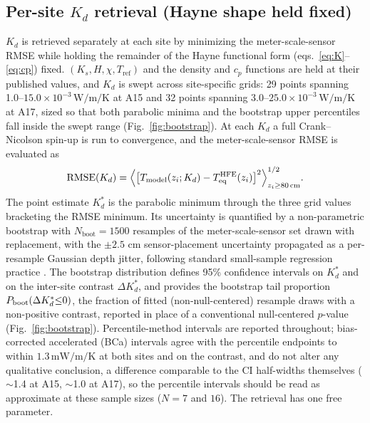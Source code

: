 \documentclass[11pt]{article}
\newcommand{\zborestem}{80\,\si{\centi\meter}}
\begin{document}
\subsection{Per-site $K_d$ retrieval (Hayne shape held fixed)}%
\label{sec:methods-kd}
$K_d$ is retrieved separately at each site by minimizing the
meter-scale-sensor RMSE while holding the remainder
of the Hayne functional form (eqs.~\ref{eq:K}--\ref{eq:cp}) fixed.
$(K_s,H,\chi,T_\mathrm{ref})$ and the density and $c_p$ functions are held
at their published values, and $K_d$ is swept across site-specific grids:
29 points spanning
1.0--$15.0\times10^{-3}\,\si{\watt\per\meter\per\kelvin}$ at A15 and 32
points spanning
3.0--$25.0\times10^{-3}\,\si{\watt\per\meter\per\kelvin}$ at A17, sized so
that both parabolic minima and the bootstrap upper percentiles fall inside
the swept range (Fig.~\ref{fig:bootstrap}).
 At each $K_d$ a full Crank--Nicolson spin-up is
run to convergence, and the
meter-scale-sensor RMSE is evaluated as
\begin{equation}
\mathrm{RMSE}(K_d) = \Bigl\langle\bigl[T_\mathrm{model}(z_i;K_d) - T_\mathrm{eq}^\mathrm{HFE}(z_i)\bigr]^2\Bigr\rangle_{z_i\ge\zborestem}^{1/2}.
\label{eq:rmse-kd}
\end{equation}
The point estimate $K_d^{*}$ is the parabolic minimum through the three
grid values bracketing the RMSE minimum. Its uncertainty is
quantified by a non-parametric bootstrap with $N_\mathrm{boot}=1500$
resamples of the meter-scale-sensor set drawn with
replacement, with the $\pm 2.5$ cm sensor-placement uncertainty
\citep{nagihara2018} propagated as a per-resample Gaussian depth jitter,
following standard small-sample regression practice \citep{press2007}. The
bootstrap distribution defines 95\% confidence intervals on $K_d^{*}$ and
on the inter-site contrast $\Delta K_d^{*}$, and provides the
bootstrap tail
proportion $P_{\rm boot}(\Delta K_d^{*}{\le}0)$, the fraction of
fitted (non-null-centered) resample draws with a non-positive contrast,
reported in place of a conventional null-centered $p$-value
(Fig.~\ref{fig:bootstrap}).
Percentile-method intervals are reported throughout; bias-corrected
accelerated (BCa) intervals \citep{efron1993} agree with the percentile
endpoints to within $1.3\,\si{\milli\watt\per\meter\per\kelvin}$ at both
sites and on the contrast, and do not alter any qualitative conclusion,
a difference comparable to the CI half-widths themselves
($\sim$1.4 at A15, $\sim$1.0 at A17), so the percentile intervals
should be read as approximate at these sample sizes ($N=7$ and $16$). The
retrieval has one free parameter.
\end{document}
